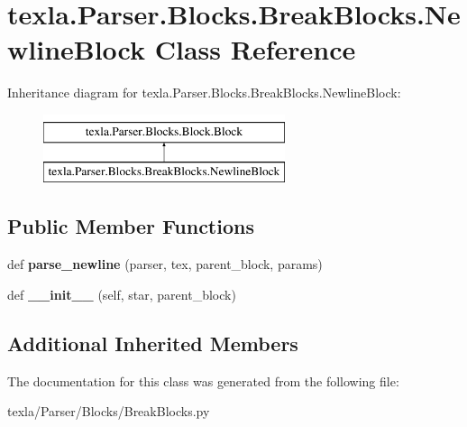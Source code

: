 \hypertarget{classtexla_1_1Parser_1_1Blocks_1_1BreakBlocks_1_1NewlineBlock}{}\section{texla.\+Parser.\+Blocks.\+Break\+Blocks.\+Newline\+Block Class Reference}
\label{classtexla_1_1Parser_1_1Blocks_1_1BreakBlocks_1_1NewlineBlock}
Inheritance diagram for texla.\+Parser.\+Blocks.\+Break\+Blocks.\+Newline\+Block\+:\begin{figure}[H]
\begin{center}
\leavevmode
\includegraphics[height=2.000000cm]{classtexla_1_1Parser_1_1Blocks_1_1BreakBlocks_1_1NewlineBlock}
\end{center}
\end{figure}
\subsection*{Public Member Functions}
\begin{DoxyCompactItemize}
\item 
\hypertarget{classtexla_1_1Parser_1_1Blocks_1_1BreakBlocks_1_1NewlineBlock_a65d850875d25efcf16942abe2dc59901}{}\label{classtexla_1_1Parser_1_1Blocks_1_1BreakBlocks_1_1NewlineBlock_a65d850875d25efcf16942abe2dc59901} 
def {\bfseries parse\+\_\+newline} (parser, tex, parent\+\_\+block, params)
\item 
\hypertarget{classtexla_1_1Parser_1_1Blocks_1_1BreakBlocks_1_1NewlineBlock_af8b2345d33c08003c972d9c6852feea6}{}\label{classtexla_1_1Parser_1_1Blocks_1_1BreakBlocks_1_1NewlineBlock_af8b2345d33c08003c972d9c6852feea6} 
def {\bfseries \+\_\+\+\_\+init\+\_\+\+\_\+} (self, star, parent\+\_\+block)
\end{DoxyCompactItemize}
\subsection*{Additional Inherited Members}


The documentation for this class was generated from the following file\+:\begin{DoxyCompactItemize}
\item 
texla/\+Parser/\+Blocks/Break\+Blocks.\+py\end{DoxyCompactItemize}
